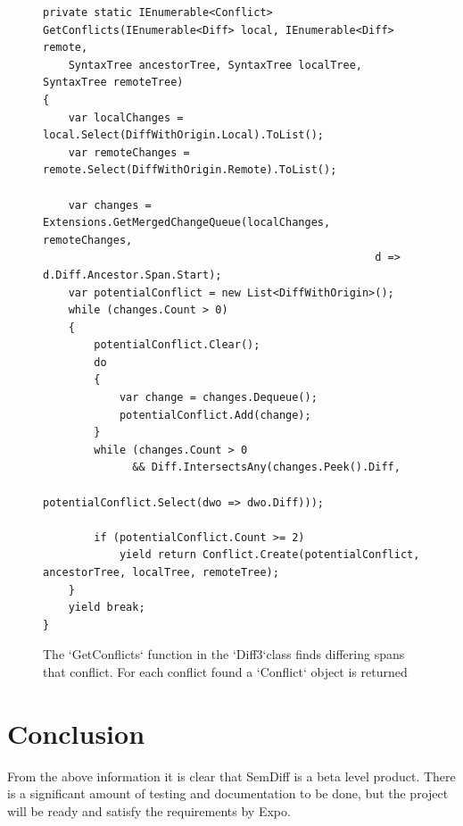 \documentclass[draftclsnofoot,onecolumn]{IEEEtran}
\begin{document}
\begin{figure}[!t]
\centering
\begin{lstlisting}
private static IEnumerable<Conflict> GetConflicts(IEnumerable<Diff> local, IEnumerable<Diff> remote, 
    SyntaxTree ancestorTree, SyntaxTree localTree, SyntaxTree remoteTree)
{
    var localChanges = local.Select(DiffWithOrigin.Local).ToList();
    var remoteChanges = remote.Select(DiffWithOrigin.Remote).ToList();

    var changes = Extensions.GetMergedChangeQueue(localChanges, remoteChanges, 
                                                    d => d.Diff.Ancestor.Span.Start);
    var potentialConflict = new List<DiffWithOrigin>();
    while (changes.Count > 0)
    {
        potentialConflict.Clear();
        do
        {
            var change = changes.Dequeue();
            potentialConflict.Add(change);
        }
        while (changes.Count > 0 
              && Diff.IntersectsAny(changes.Peek().Diff, 
                                           potentialConflict.Select(dwo => dwo.Diff)));

        if (potentialConflict.Count >= 2)
            yield return Conflict.Create(potentialConflict, ancestorTree, localTree, remoteTree);
    }
    yield break;
}
\end{lstlisting}
\caption{The `GetConflicts` function in the `Diff3`class finds differing 
spans that conflict. For each conflict found a `Conflict` object is returned}
\label{diff3getconflicts}
\end{figure}







\section{Conclusion}

From the above information it is clear that SemDiff is a beta level product. 
There is a significant amount of testing and documentation to be done, but 
the project will be ready and satisfy the requirements by Expo.
\end{document}
